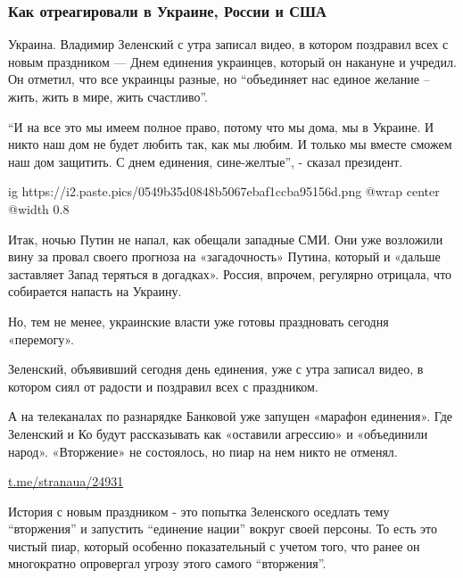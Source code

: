  
 
 
 
 

\subsubsection{Как отреагировали в Украине, России и США}

Украина. Владимир Зеленский с утра записал видео, в котором поздравил всех с
новым праздником — Днем единения украинцев, который он накануне и учредил. Он
отметил, что все украинцы разные, но \enquote{объединяет нас единое желание – жить,
жить в мире, жить счастливо}.

\enquote{И на все это мы имеем полное право, потому что мы дома, мы в Украине. И никто
наш дом не будет любить так, как мы любим. И только мы вместе сможем наш дом
защитить. С днем единения, сине-желтые}, - сказал президент.

\ifcmt
  ig https://i2.paste.pics/0549b35d0848b5067ebaf1ccba95156d.png
  @wrap center
  @width 0.8
\fi

Итак, ночью Путин не напал, как обещали западные СМИ. Они уже возложили вину за
провал своего прогноза на «загадочность» Путина, который и «дальше заставляет
Запад теряться в догадках». Россия, впрочем, регулярно отрицала, что собирается
напасть на Украину.

Но, тем не менее, украинские власти уже готовы праздновать сегодня «перемогу».

Зеленский, объявивший сегодня день единения, уже с утра записал видео, в
котором сиял от радости и поздравил всех с праздником.

А на телеканалах по разнарядке Банковой уже запущен «марафон единения». Где
Зеленский и Ко будут рассказывать как «оставили агрессию» и «объединили народ».
«Вторжение» не состоялось, но пиар на нем никто не отменял.

\url{t.me/stranaua/24931}

История с новым праздником - это попытка Зеленского оседлать тему \enquote{вторжения} и
запустить \enquote{единение нации} вокруг своей персоны. То есть это чистый пиар,
который особенно показательный с учетом того, что ранее он многократно
опровергал угрозу этого самого \enquote{вторжения}. 

